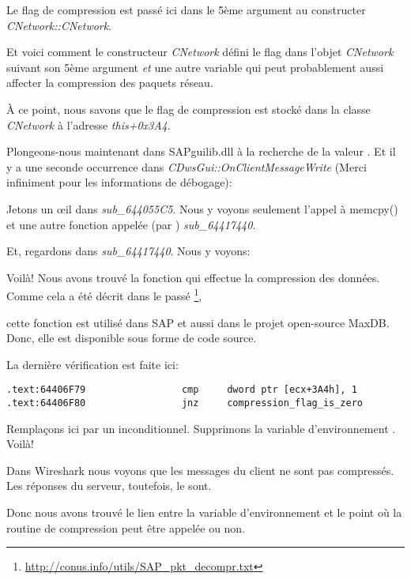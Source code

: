 Le flag de compression est passé ici dans le 5ème argument au constructer \emph{CNetwork::CNetwork}.

Et voici comment le constructeur \emph{CNetwork} défini le flag dans l'objet \emph{CNetwork}
suivant son 5ème argument \emph{et} une autre variable qui peut probablement aussi
affecter la compression des paquets réseau.



À ce point, nous savons que le flag de compression est stocké dans la classe
\emph{CNetwork} à l'adresse \emph{this+0x3A4}.

Plongeons-nous maintenant dans SAPguilib.dll à la recherche de la valeur .
Et il y a une seconde occurrence dans \emph{CDwsGui::OnClientMessageWrite} (Merci
infiniment pour les informations de débogage):



Jetons un \oe{}il dans \emph{sub\_644055C5}. Nous y voyons seulement l'appel à memcpy()
et une autre fonction appelée (par \IDA) \emph{sub\_64417440}.

Et, regardons dans \emph{sub\_64417440}. Nous y voyons:



Voilà! Nous avons trouvé la fonction qui effectue la compression des données.
Comme cela a été décrit dans le passé
\footnote{\url{http://conus.info/utils/SAP_pkt_decompr.txt}},

cette fonction est utilisé dans SAP et aussi dans le projet open-source MaxDB.
Donc, elle est disponible sous forme de code source.

La dernière vérification est faite ici:

\begin{lstlisting}[style=customasmx86]
.text:64406F79                 cmp     dword ptr [ecx+3A4h], 1
.text:64406F80                 jnz     compression_flag_is_zero
\end{lstlisting}

Remplaçons ici \JNZ par un \JMP inconditionnel. Supprimons la variable d'environnement
\TDWNC. Voilà!

Dans Wireshark nous voyons que les messages du client ne sont pas compressés. Les
réponses du serveur, toutefois, le sont.

Donc nous avons trouvé le lien entre la variable d'environnement et le point où la
routine de compression peut être appelée ou non.
